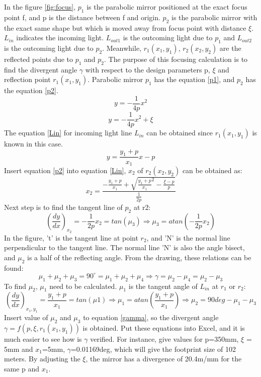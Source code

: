 In the figure \ref{fig:focus}, $p_{1}$ is the parabolic mirror positioned at the exact focus point f, and p is the distance between f and origin. $p_{2}$ is the parabolic mirror with the exact same shape but which is moved away from focus point with distance $\xi$. $L_{in}$ indicates the incoming light. $L_{out1}$ is the outcoming light due to $p_{1}$ and $L_{out2}$ is the outcoming light due to $p_{2}$. Meanwhile, $r_{1}(x_{1}, y_{1})$, $r_{2}(x_{2}, y_{2})$ are the reflected points due to $p_{1}$ and $p_{2}$. The purpose of this focusing calculation is to find the divergent angle $\gamma$ with respect to the design parameters p, $\xi$ and reflection point $r_{1}(x_{1}, y_{1})$. \cite{parabolic_wiki}Parabolic mirror $p_{1}$ has the equation \ref{p1}, and $p_{2}$ has the equation \ref{p2}. 
\begin{equation}
\label{p1}
y = -\frac{1}{4p}x^{2}
\end {equation}
\begin{equation}
\label{p2}
y = -\frac{1}{4p}x^{2}+\xi
\end {equation}
The equation \ref{Lin} for incoming light line $L_{in}$ can be obtained since $r_{1}(x_{1}, y_{1})$ is known in this case. 
\begin{equation}
\label{Lin}
y = \frac{y_{1}+p}{x_{1}}x-p
\end {equation}
Insert equation \ref{p2} into equation \ref{Lin}, $x_{2}$ of $r_{2}(x_{2}, y_{2})$ can be obtained as:
\begin{equation}
\label{x2}
x_{2} = \frac{-\frac{y_{1}+p}{x_{1}}+\sqrt{{\frac{y_{1}+p}{x_{1}}}^2-\frac{\xi-p}{p}}}{\frac{1}{2p}}
\end {equation}
Next step is to find the tangent line of $p_{2}$ at r2:
\begin{equation}
\label{miu3}
(\frac{dy}{dx})_{x_{2}} = -\frac{1}{2p}x_{2} = tan(\mu_{3}) \Rightarrow \mu_{3} = atan(-\frac{1}{2p}x_{2})
\end {equation}
In the figure, 't' is the tangent line at point $r_{2}$, and 'N' is the normal line perpendicular to the tangent line. The normal line 'N' is also the angle bisect, and $\mu_{2}$ is a half of the reflecting angle. From the drawing, these relations can be found:
\begin{equation}
\label{gamma}
\mu_{1}+\mu_{2}+\mu_{3} = 90^{\circ} = \mu_{1}+\mu_{2}+\mu_{4}
\Longrightarrow \gamma = \mu_{2} - \mu_{4} = \mu_{2} - \mu_{3} 
\end {equation}
To find $\mu_{2}$, $\mu_{1}$ need to be calculated. $\mu_{1}$ is the tangent angle of $L_{in}$ at $r_{1}$ or $r_{2}$:
\begin{equation}
\label{miu2}
(\frac{dy}{dx})_{x_{1},y_{1}} = \frac{y_{1}+p}{x_{1}} = tan(\mu{1})\Rightarrow \mu_{1} = atan(\frac{y_{1}+p}{x_{1}}) \Rightarrow \mu_{2} = 90deg - \mu_{1} - \mu_{3}
\end {equation}
Insert value of $\mu_{2}$ and $\mu_{3}$ to equation \ref{gamma}, so the divergent angle $\gamma = f(p, \xi, r_{1}(x_{1}, y_{1}))$ is obtained. Put these equations into Excel, and it is much easier to see how is $\gamma$ verified. For instance, give values for p=350mm, $\xi$ = 5mm and $x_{1}$=5mm, $\gamma$=0.01169deg, which will give the footprint size of 102 meters. By adjusting the $\xi$, the mirror has a divergence of 20.4m/mm for the same p and $x_{1}$.